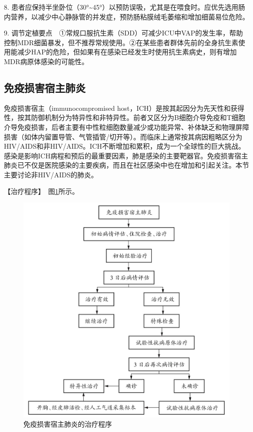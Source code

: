 8.
患者应保持半坐卧位（30°\textasciitilde{}45°）以预防误吸，尤其是在喂食时。应优先选用肠内营养，以减少中心静脉管的并发症，预防肠粘膜绒毛萎缩和增加细菌易位危险。

9.
调节定植要点　①常规口服抗生素（SDD）可减少ICU中VAP的发生率，帮助控制MDR细菌暴发，但不推荐常规使用。②在某些患者群体先前的全身抗生素使用能减少HAP的危险，但如果有在感染已经发生时使用抗生素病史，则有增加MDR病原体感染的可能性。

\subsection{免疫损害宿主肺炎}

免疫损害宿主（immunocompromised
host，ICH）是按其起因分为先天性和获得性，按其防御机制分为特异性和非特异性。前者又区分为B细胞介导免疫和T细胞介导免疫损害，后者主要有中性粒细胞数量减少或功能异常、补体缺乏和物理屏障损害（如体内留置导管、气管插管/切开等）。而临床上通常按其病因粗略区分为HIV/AIDS和非HIV/AIDS。ICH不断增加和累积，成为一个全球性的巨大挑战。感染是影响ICH病程和预后的最重要因素，肺是感染的主要靶器官。免疫损害宿主肺炎已不仅是医院感染的主要疾病，而且在社区感染中也在增加和引起关注。本节主要讨论非HIV/AIDS的肺炎。

【治疗程序】　图\ref{fig1-8-3}所示。

\begin{figure}[!htbp]
 \centering
 \includegraphics{./images/Image00019.jpg}
 \captionsetup{justification=centering}
 \caption{免疫损害宿主肺炎的治疗程序}
 \label{fig1-8-3}
  \end{figure} 

